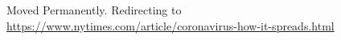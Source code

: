 Moved Permanently. Redirecting to
\url{https://www.nytimes.com/article/coronavirus-how-it-spreads.html}

